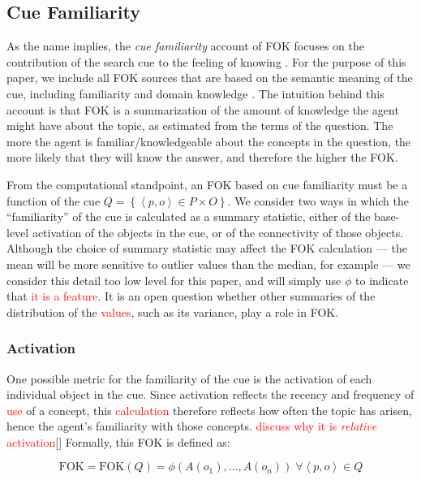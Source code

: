 \documentclass[10pt,letterpaper]{article}
\newcommand{\fixme}[2][]{#2}
\renewcommand{\fixme}[2][]{\textcolor{red}{#2}}
\newcommand{\setof}[1]{\left \{ #1 \right \}}
\newcommand{\tuple}[1]{\left \langle #1 \right \rangle }
\newcommand{\fok}[0]{\text{FOK}}
\begin{document}
\subsection{Cue Familiarity}

As the name implies, the \emph{cue familiarity} account of FOK focuses on the contribution of the search cue to the feeling of knowing \cite{Reder1992WhatDeterminesInitial,Metcalfe1993TheCueFamiliarity,Koriat2001TheCombinedContributions}.
For the purpose of this paper, we include all FOK sources that are based on the semantic meaning of the cue, including familiarity and domain knowledge \cite{Schwartz1994SourcesOfInformation}.
The intuition behind this account is that FOK is a summarization of the amount of knowledge the agent might have about the topic, as estimated from the terms of the question.
The more the agent is familiar/knowledgeable about the concepts in the question, the more likely that they will know the answer, and therefore the higher the FOK.

From the computational standpoint, an FOK based on cue familiarity must be a function of the cue $Q = \setof{\tuple{p, o}{\in}P{\times}O}$.
We consider two ways in which the ``familiarity'' of the cue is calculated as a summary statistic, either of the base-level activation of the objects in the cue, or of the connectivity of those objects.
Although the choice of summary statistic may affect the FOK calculation --- the mean will be more sensitive to outlier values than the median, for example --- we consider this detail too low level for this paper, and will simply use $\phi$ to indicate that \fixme{it is a feature}.
It is an open question whether other summaries of the distribution of the \fixme{values}, such as its variance, play a role in FOK.

\subsubsection{Activation}

One possible metric for the familiarity of the cue is the activation of each individual object in the cue.
Since activation reflects the recency and frequency of \fixme{use} of a concept, this \fixme{calculation} therefore reflects how often the topic has arisen, hence the agent's familiarity with those concepts.
\fixme{discuss why it is \emph{relative} activation}[]
Formally, this FOK is defined as:

$$\fok = \fok(Q) = \phi\left(A(o_1), ..., A(o_n)\right) \; \forall {\tuple{p, o}{\in}Q}$$
\end{document}
